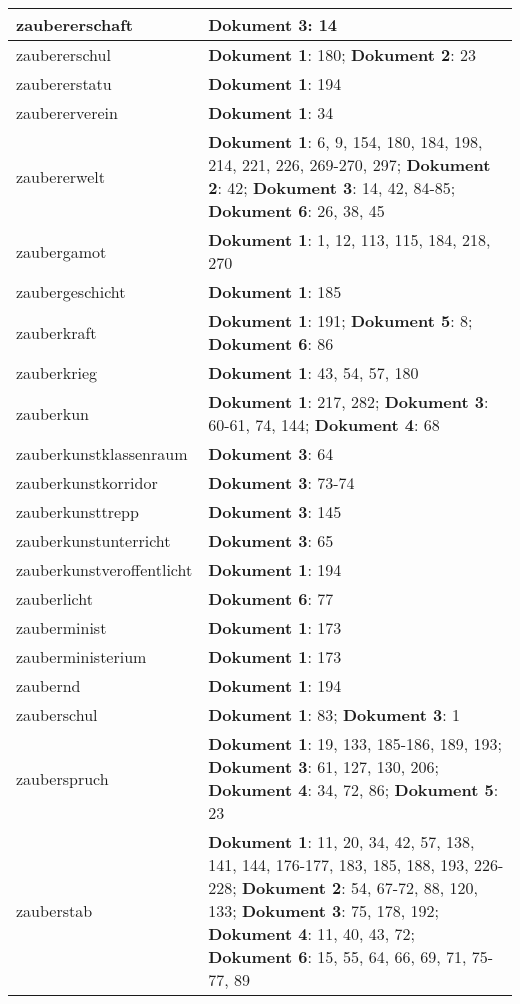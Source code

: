 \documentclass[a5paper]{article}
\begin{document}
\begin{longtable}[l]{|l|p{3in}|}
\hline
zaubererschaft & \textbf{Dokument 3}: 14 \\
\hline
zaubererschul & \textbf{Dokument 1}: 180; \textbf{Dokument 2}: 23 \\
\hline
zaubererstatu & \textbf{Dokument 1}: 194 \\
\hline
zaubererverein & \textbf{Dokument 1}: 34 \\
\hline
zaubererwelt & \textbf{Dokument 1}: 6, 9, 154, 180, 184, 198, 214, 221, 226, 269-270, 297; \textbf{Dokument 2}: 42; \textbf{Dokument 3}: 14, 42, 84-85; \textbf{Dokument 6}: 26, 38, 45 \\
\hline
zaubergamot & \textbf{Dokument 1}: 1, 12, 113, 115, 184, 218, 270 \\
\hline
zaubergeschicht & \textbf{Dokument 1}: 185 \\
\hline
zauberkraft & \textbf{Dokument 1}: 191; \textbf{Dokument 5}: 8; \textbf{Dokument 6}: 86 \\
\hline
zauberkrieg & \textbf{Dokument 1}: 43, 54, 57, 180 \\
\hline
zauberkun & \textbf{Dokument 1}: 217, 282; \textbf{Dokument 3}: 60-61, 74, 144; \textbf{Dokument 4}: 68 \\
\hline
zauberkunstklassenraum & \textbf{Dokument 3}: 64 \\
\hline
zauberkunstkorridor & \textbf{Dokument 3}: 73-74 \\
\hline
zauberkunsttrepp & \textbf{Dokument 3}: 145 \\
\hline
zauberkunstunterricht & \textbf{Dokument 3}: 65 \\
\hline
zauberkunstveroffentlicht & \textbf{Dokument 1}: 194 \\
\hline
zauberlicht & \textbf{Dokument 6}: 77 \\
\hline
zauberminist & \textbf{Dokument 1}: 173 \\
\hline
zauberministerium & \textbf{Dokument 1}: 173 \\
\hline
zaubernd & \textbf{Dokument 1}: 194 \\
\hline
zauberschul & \textbf{Dokument 1}: 83; \textbf{Dokument 3}: 1 \\
\hline
zauberspruch & \textbf{Dokument 1}: 19, 133, 185-186, 189, 193; \textbf{Dokument 3}: 61, 127, 130, 206; \textbf{Dokument 4}: 34, 72, 86; \textbf{Dokument 5}: 23 \\
\hline
zauberstab & \textbf{Dokument 1}: 11, 20, 34, 42, 57, 138, 141, 144, 176-177, 183, 185, 188, 193, 226-228; \textbf{Dokument 2}: 54, 67-72, 88, 120, 133; \textbf{Dokument 3}: 75, 178, 192; \textbf{Dokument 4}: 11, 40, 43, 72; \textbf{Dokument 6}: 15, 55, 64, 66, 69, 71, 75-77, 89 \\

\end{longtable}
\end{document}
